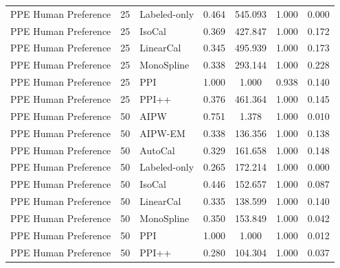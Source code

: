 \begin{tabular}{lllrccc}
PPE Human Preference & 25 & Labeled-only & 0.464 & 545.093 & 1.000 & 0.000 \\
PPE Human Preference & 25 & IsoCal & 0.369 & 427.847 & 1.000 & 0.172 \\
PPE Human Preference & 25 & LinearCal & 0.345 & 495.939 & 1.000 & 0.173 \\
PPE Human Preference & 25 & MonoSpline & 0.338 & 293.144 & 1.000 & 0.228 \\
PPE Human Preference & 25 & PPI & 1.000 & 1.000 & 0.938 & 0.140 \\
PPE Human Preference & 25 & PPI++ & 0.376 & 461.364 & 1.000 & 0.145 \\
PPE Human Preference & 50 & AIPW & 0.751 & 1.378 & 1.000 & 0.010 \\
PPE Human Preference & 50 & AIPW-EM & 0.338 & 136.356 & 1.000 & 0.138 \\
PPE Human Preference & 50 & AutoCal & 0.329 & 161.658 & 1.000 & 0.148 \\
PPE Human Preference & 50 & Labeled-only & 0.265 & 172.214 & 1.000 & 0.000 \\
PPE Human Preference & 50 & IsoCal & 0.446 & 152.657 & 1.000 & 0.087 \\
PPE Human Preference & 50 & LinearCal & 0.335 & 138.599 & 1.000 & 0.140 \\
PPE Human Preference & 50 & MonoSpline & 0.350 & 153.849 & 1.000 & 0.042 \\
PPE Human Preference & 50 & PPI & 1.000 & 1.000 & 1.000 & 0.012 \\
PPE Human Preference & 50 & PPI++ & 0.280 & 104.304 & 1.000 & 0.037 \\
\bottomrule
\end{tabular}

